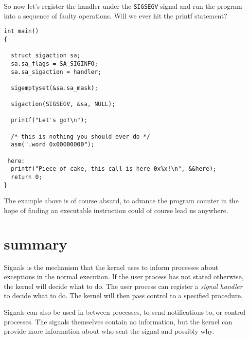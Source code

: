 \documentclass[a4paper,11pt]{article}
\begin{document}
So now let's register the handler under the {\tt SIGSEGV} signal and
run the program into a sequence of faulty operations. Will we ever hit
the printf statement?

\begin{lstlisting}
int main()
{

  struct sigaction sa;
  sa.sa_flags = SA_SIGINFO;
  sa.sa_sigaction = handler;

  sigemptyset(&sa.sa_mask);

  sigaction(SIGSEGV, &sa, NULL);

  printf("Let's go!\n");

  /* this is nothing you should ever do */
  asm(".word 0x00000000");

 here:
  printf("Piece of cake, this call is here 0x%x!\n", &&here);
  return 0;
}
\end{lstlisting}

The example above is of course absurd, to advance the program counter
in the hope of finding an executable instruction could of course lead
us anywhere.

\section{summary}

Signals is the mechanism that the kernel uses to inform processes about
exceptions in the normal execution. If the user process has not stated
otherwise, the kernel will decide what to do. The user process can
register a {\em signal handler} to decide what to do.  The kernel will
then pass control to a specified procedure.

Signals can also be used in between processes, to send notifications to, or
control processes. The signals themselves contain no information, but
the kernel can provide more information about who sent the signal and
possibly why.
\end{document}
